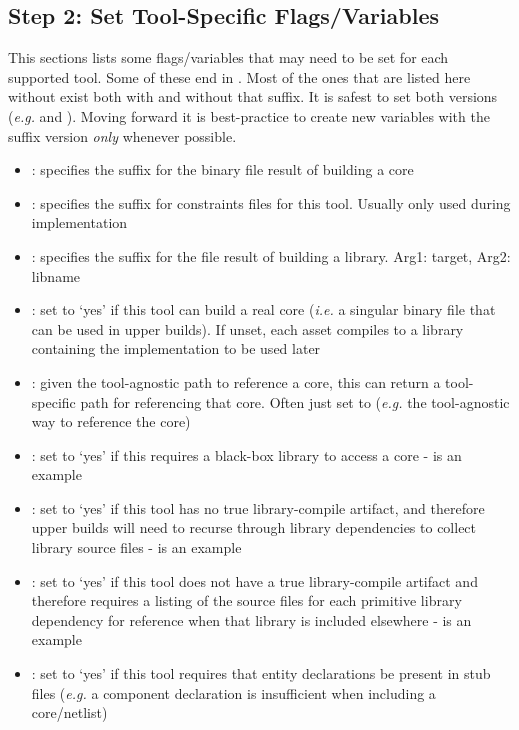 \subsection{Step 2: Set Tool-Specific Flags/Variables}
\label{flags}
This sections lists some flags/variables that may need to be set for each supported tool. Some of these end in . Most of the ones that are listed here without  exist both with and without that suffix. It is safest to set both versions (\textit{e.g.}  and ). Moving forward it is best-practice to create new variables with the  suffix version \textit{only} whenever possible.
\begin{itemize}
\item {}: specifies the suffix for the binary file result of building a core
\item {}: specifies the suffix for constraints files for this tool. Usually only used during implementation
\item {}: specifies the suffix for the file result of building a library. Arg1: target, Arg2: libname
\item {}: set to `yes' if this tool can build a real core (\textit{i.e.} a singular binary file that can be used in upper builds). If unset, each asset compiles to a library containing the implementation to be used later
\item {}: given the tool-agnostic path to reference a core, this can return a tool-specific path for referencing that core. Often just set to  (\textit{e.g.} the tool-agnostic way to reference the core)
\item {}: set to `yes' if this requires a black-box library to access a core
  \subitem -  is an example
\item {}: set to `yes' if this tool has no true library-compile artifact, and therefore upper builds will need to recurse through library dependencies to collect library source files
  \subitem -  is an example
\item {}: set to `yes' if this tool does not have a true library-compile artifact and therefore requires a listing of the source files for each primitive library dependency for reference when that library is included elsewhere
  \subitem -  is an example
\item {}: set to `yes' if this tool requires that entity declarations be present in stub files (\textit{e.g.} a component declaration is insufficient when including a core/netlist)

\end{itemize}
